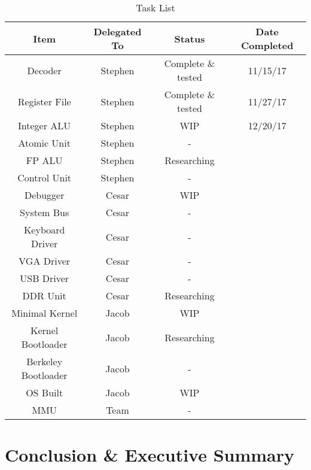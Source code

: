 \documentclass{article}
\begin{document}
\begin{table}[ht]
\centering
\caption{Task List}
\label{my-label}
\begin{tabular}{|c|c|c|c|}
\hline
\textbf{Item}       & \textbf{Delegated To} & \textbf{Status}    & \textbf{Date Completed} \\ \hline
Decoder             & Stephen               & Complete \& tested & 11/15/17                \\ \hline
Register File       & Stephen               & Complete \& tested & 11/27/17                \\ \hline
Integer ALU         & Stephen               & WIP                & 12/20/17                \\ \hline
Atomic Unit         & Stephen               & -                  &                         \\ \hline
FP ALU              & Stephen               & Researching        &                         \\ \hline
Control Unit        & Stephen               & -                  &                         \\ \hline
Debugger            & Cesar                 & WIP                &                         \\ \hline
System Bus          & Cesar                 & -                  &                         \\ \hline
Keyboard Driver     & Cesar                 & -                  &                         \\ \hline
VGA Driver          & Cesar                 & -                  &                         \\ \hline
USB Driver          & Cesar                 & -                  &                         \\ \hline
DDR Unit            & Cesar                 & Researching        &                         \\ \hline
Minimal Kernel      & Jacob                 & WIP                &                         \\ \hline
Kernel Bootloader   & Jacob                 & Researching        &                         \\ \hline
Berkeley Bootloader & Jacob                 & -                  &                         \\ \hline
OS Built            & Jacob                 & WIP                &                         \\ \hline
MMU                 & Team                  & -                  &                         \\ \hline
\end{tabular}
\end{table}

\section{Conclusion \& Executive Summary}

\printbibliography
\end{document}
